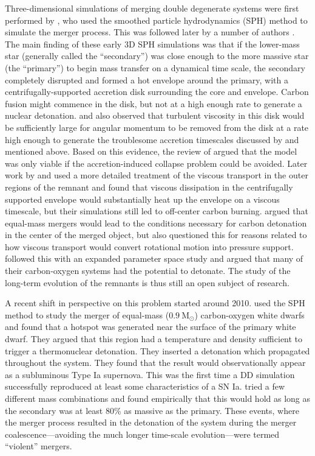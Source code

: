 \documentclass[iop,numberedappendix]{../emulateapj}
\newcommand{\msolar}{\mathrm{M}_\odot}
\begin{document}
Three-dimensional simulations of merging double degenerate systems were 
first performed by \citet{benz:1990}, who used the smoothed particle
hydrodynamics (SPH) method to simulate the merger process. This was 
followed later by a number of authors 
\citep{rasio_shapiro:1995,segretain:1997,guerrero:2004,yoon:2007,loren-aguilar:2009,raskin:2012}.
The main finding of these early 3D SPH simulations was that if the 
lower-mass star (generally called the ``secondary'') was
close enough to the more massive star (the ``primary'') to begin mass
transfer on a dynamical time scale, the secondary completely disrupted
and formed a hot envelope around the primary, with a
centrifugally-supported accretion disk surrounding the core and
envelope. Carbon fusion might commence in the disk, but not at a 
high enough rate to generate a nuclear detonation. \cite{mochkovitch_livio:1990} 
and \cite{livio:2000}  also observed that turbulent viscosity in this disk 
would be sufficiently large for angular momentum to be removed from the 
disk at a rate high enough to generate the troublesome accretion 
timescales discussed by \cite{tutukov_yungelson:1979} and mentioned above. Based on this
evidence, the review of \cite{hillebrandtniemeyer2000} argued that the
model was only viable if the accretion-induced collapse problem could
be avoided. Later work by \cite{shen:2012} and \cite{schwab:2012} used
a more detailed treatment of the viscous transport in the outer
regions of the remnant and found that viscous dissipation in the centrifugally
supported envelope would substantially heat up the envelope on a  
viscous timescale, but their simulations still led to off-center carbon
burning. \cite{vankerkwijk:2010} argued that equal-mass mergers would
lead to the conditions necessary for carbon detonation in the center
of the merged object, but \cite{shen:2012} also questioned this for
reasons related to how viscous transport would convert rotational
motion into pressure support. \cite{zhu:2013} followed this with an
expanded parameter space study and argued that many of their
carbon-oxygen systems had the potential to detonate. The study of the
long-term evolution of the remnants is thus still an open subject of
research.

A recent shift in perspective on this problem started around 2010.
\cite{pakmor:2010} used the SPH method to study the merger of 
equal-mass ($0.9\ \msolar$) carbon-oxygen white dwarfs and found 
that a hotspot was generated near the surface of the primary 
white dwarf. They argued that this region had a temperature 
and density sufficient to trigger a thermonuclear
detonation. They inserted a detonation which propagated throughout 
the system. They found that the result would observationally 
appear as a subluminous Type Ia supernova. This was the first time 
a DD simulation successfully reproduced at least some characteristics of a SN
Ia. \cite{pakmor:2011} tried a few different mass combinations and
found empirically that this would hold as long as the secondary was at
least 80\% as massive as the primary. These events, where the merger
process resulted in the detonation of the system during the merger
coalescence---avoiding the much longer time-scale evolution---were
termed ``violent'' mergers.
\end{document}
